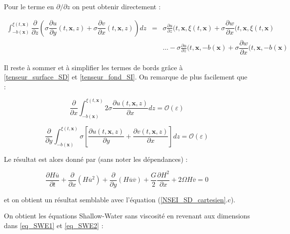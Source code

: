 \documentclass[10pt,a4paper]{amsart}
\def\gint{\displaystyle\int}
\begin{document}
Pour le terme en $\partial / \partial z$ on peut obtenir directement :

\begin{eqnarray*}
\gint_{-b(\mathbf{x})}^{\xi(t, \mathbf{x})} \dfrac{\partial}{\partial z} \left( \sigma \dfrac{\partial u}{\partial y}(t, \mathbf{x}, z) + \sigma \dfrac{\partial v}{\partial x}(t, \mathbf{x}, z) \right) dz & = & \sigma \frac{\partial u}{\partial z}(t, \mathbf{x}, \xi(t, \mathbf{x}) + \sigma \dfrac{\partial w}{\partial x}(t, \mathbf{x}, \xi(t, \mathbf{x}) \\
&  & \ldots - \sigma \frac{\partial u}{\partial z}(t, \mathbf{x}, -b(\mathbf{x}) + \sigma \dfrac{\partial w}{\partial x}(t, \mathbf{x}, -b(\mathbf{x}) 
\end{eqnarray*}

Il reste à sommer et à simplifier les termes de bords grâce à \eqref{tenseur_surface_SD} et \eqref{tenseur_fond_SI}. On remarque de plus facilement que :

$$\dfrac{\partial}{\partial x} \gint_{-b(\mathbf{x})}^{\xi(t, \mathbf{x})} 2 \sigma \dfrac{\partial u(t, \mathbf{x}, z)}{\partial x}dz = \mathcal{O}\left( \varepsilon \right)$$

$$\dfrac{\partial}{\partial y} \gint_{-b(\mathbf{x})}^{\xi(t, \mathbf{x})} \sigma \left[ \dfrac{\partial u(t, \mathbf{x},z)}{\partial y} + \dfrac{\partial v(t, \mathbf{x},z)}{\partial x}\right]dz = \mathcal{O}\left( \varepsilon \right)$$

Le résultat est alors donné par (sans noter les dépendances) :

\begin{equation} \label{eq_SWE2}
\dfrac{\partial H \overline{u}}{\partial t} + \dfrac{\partial}{\partial x} \left( H \overline{u}^2 \right) + \dfrac{\partial}{\partial y} \left( H \overline{u} \overline{v} \right) + \dfrac{G}{2}\dfrac{\partial H^2}{\partial x} + 2 \Omega H \overline{v}= 0
\end{equation}

et on obtient un résultat semblable avec l'équation (\ref{NSEI_SD_cartesien}.c).

On obtient les équations Shallow-Water sans viscosité en revenant aux dimensions dans \eqref{eq_SWE1} et \eqref{eq_SWE2} :
\end{document}
